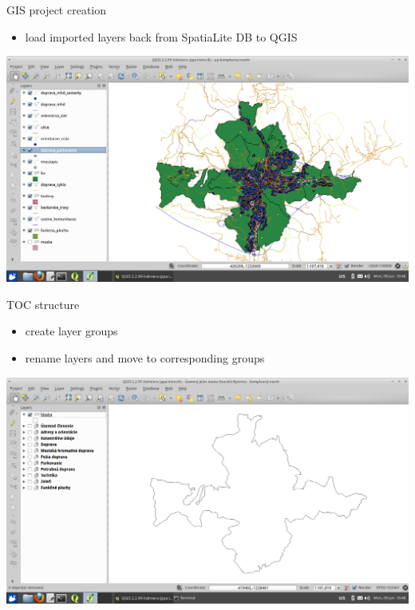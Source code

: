 \documentclass[12pt]{beamer}
\begin{document}
\begin{frame}{GIS project creation}
	\begin{itemize}
		\item load imported layers back from SpatiaLite DB to QGIS
	\end{itemize}
	\begin{center}
		\includegraphics[keepaspectratio=true,height=0.6\textheight]{images/real-world-example/project-load-layers.png}
	\end{center}
\end{frame}


\begin{frame}{TOC structure}
	\begin{itemize}
		\item create layer groups
		\item rename layers and move to corresponding groups
	\end{itemize}
	\begin{center}
		\includegraphics[keepaspectratio=true,height=0.6\textheight]{images/real-world-example/project-create-layer-groups.png}
	\end{center}
\end{frame}
\end{document}
